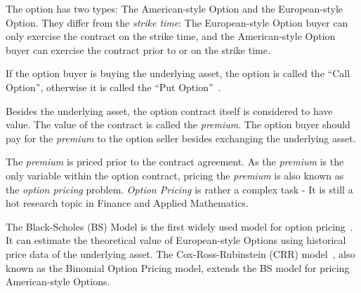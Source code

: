 The option has two types: The American-style Option and the European-style Option.
They differ from the \textit{strike time}:
The European-style Option buyer can only exercise the contract on the strike time,
and the American-style Option buyer can exercise the contract prior to or on the strike time.

If the option buyer is buying the underlying asset, the option is called the ``Call Option'', otherwise it is called the ``Put Option''~\cite{smith2004history-option}.

Besides the underlying asset, the option contract itself is considered to have value.
The value of the contract is called the \textit{premium}.
The option buyer should pay for the \textit{premium} to the option seller besides exchanging the underlying asset.

The \textit{premium} is priced prior to the contract agreement.
As the \textit{premium} is the only variable within the option contract,
pricing the \textit{premium} is also known as the \textit{option pricing} problem.
\textit{Option Pricing} is rather a complex task - It is still a hot research topic in Finance and Applied Mathematics.

The Black-Scholes (BS) Model is the first widely used model for option pricing~\cite{black1973pricing}.
It can estimate the theoretical value of European-style Options using historical price data of the underlying asset.
The Cox-Ross-Rubinstein (CRR) model~\cite{cox1979option}, also known as the Binomial Option Pricing model, extends the BS model for pricing American-style Options.
